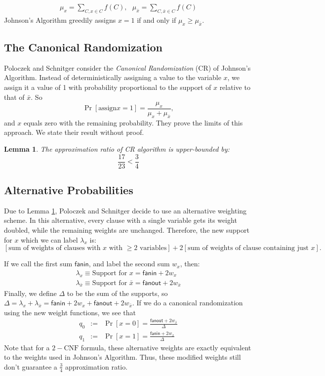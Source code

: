 \documentclass[11pt,letter]{article}
\newtheorem{lemma}[theorem]{Lemma}
\numberwithin{theorem}{section}
\begin{document}
\begin{align*}
\mu_x = \sum_{C,x\in C}f(C), \,\,\,\, \mu_{\bar{x}} =\sum_{C,\bar{x}\in C}f(C)
\end{align*}
Johnson's Algorithm greedily assigns $x=1$ if and only if $\mu_x \ge \mu_{\bar{x}}$.

\subsection*{The Canonical Randomization}
Poloczek and Schnitger consider the \emph{Canonical Randomization} (CR) of Johnson's Algorithm. Instead of deterministically assigning a value to the variable $x$, we assign it a value of 1 with probability proportional to the support of $x$ relative to that of $\bar{x}$. So
\[\Pr[\mathrm{assign } x=1] = \frac{\mu_x}{\mu_x + \mu_{\bar{x}}},\] and $x$ equals zero with the remaining probability. They prove the limits of this approach. We state their result without proof. 

\begin{lemma}
\label{L:1}
The approximation ratio of CR algorithm is upper-bounded by:
$$\frac{17}{23} < \frac{3}{4}$$

\end{lemma}

\subsection*{Alternative Probabilities}
Due to Lemma \ref{L:1}, Poloczek and Schnitger decide to use an alternative weighting scheme. In this alternative, every clause with a single variable gets its weight doubled, while the remaining weights are unchanged. Therefore, the new support for $x$ which we can label $\lambda_x$ is:
\[[\textrm{sum of weights of clauses with }x\textrm{ with }\ge 2\textrm{ variables}] + 2[\textrm{sum of weights of clause containing just }x].\]

If we call the first sum $\mathsf{fanin}$, and label the second sum $w_x$, then:
\begin{eqnarray*}
\lambda_x \equiv \textrm{Support for } x = \mathsf{fanin} + 2w_x\\
\lambda_{\bar{x}} \equiv \textrm{Support for } \bar{x} = \mathsf{fanout} + 2w_{\bar{x}}
\end{eqnarray*}
Finally, we define $\Delta$ to be the sum of the supports, so $\Delta = \lambda_{x} + \lambda_{\bar{x}} = \mathsf{fanin} + 2w_x + \mathsf{fanout} + 2w_{\bar{x}}$. If we do a canonical randomization  using the new weight functions, we see that
\begin{eqnarray*}
q_0 &:=& \Pr[x=0] = \frac{\mathsf{fanout} + 2w_{\bar{x}}}{\Delta}\\
q_1 &:=& \Pr[x=1] = \frac{\mathsf{fanin} + 2w_x}{\Delta}
\end{eqnarray*}
Note that for a $2-\text{CNF}$ formula, these alternative weights are exactly equivalent to the weights used in Johnson's Algorithm. Thus, these modified weights still don't guarantee a $\frac{3}{4}$ approximation ratio.
\end{document}
